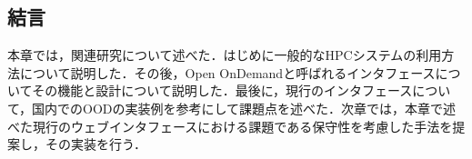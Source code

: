 \subsection{結言}
本章では，関連研究について述べた．はじめに一般的なHPCシステムの利用方法について説明した．その後，Open OnDemandと呼ばれるインタフェースについてその機能と設計について説明した．最後に，現行のインタフェースについて，国内でのOODの実装例を参考にして課題点を述べた．次章では，本章で述べた現行のウェブインタフェースにおける課題である保守性を考慮した手法を提案し，その実装を行う．\par